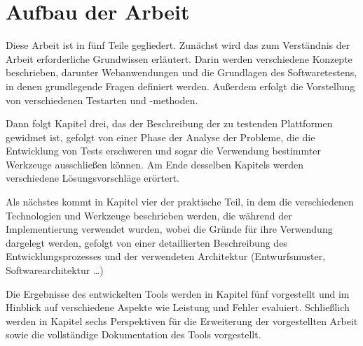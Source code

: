 \section{Aufbau der Arbeit}


Diese Arbeit ist in fünf Teile gegliedert. Zunächst wird das zum Verständnis der
Arbeit erforderliche Grundwissen erläutert. Darin werden verschiedene Konzepte
beschrieben, darunter Webanwendungen und die Grundlagen des Softwaretestens,
in denen grundlegende Fragen definiert werden. Außerdem erfolgt die Vorstellung
von verschiedenen Testarten und -methoden.


Dann folgt Kapitel drei, das der Beschreibung der zu testenden Plattformen
gewidmet ist, gefolgt von einer Phase der Analyse der Probleme, die die
Entwicklung von Tests erschweren und sogar die Verwendung bestimmter Werkzeuge
ausschließen können.  Am Ende desselben Kapitels werden verschiedene
Lösungsvorschläge erörtert.


Als nächstes kommt in Kapitel vier  der praktische Teil, in dem die verschiedenen
Technologien und Werkzeuge beschrieben werden, die während der Implementierung
verwendet wurden, wobei die Gründe für ihre Verwendung dargelegt werden,
gefolgt von einer detaillierten Beschreibung des Entwicklungsprozesses und
der verwendeten Architektur (Entwurfsmuster, Softwarearchitektur \ldots)


Die Ergebnisse des entwickelten Tools werden in Kapitel fünf vorgestellt und im
Hinblick auf verschiedene Aspekte wie Leistung und Fehler evaluiert. Schließlich
werden in Kapitel sechs Perspektiven für die Erweiterung der vorgestellten
Arbeit sowie die vollständige Dokumentation des Tools vorgestellt.

